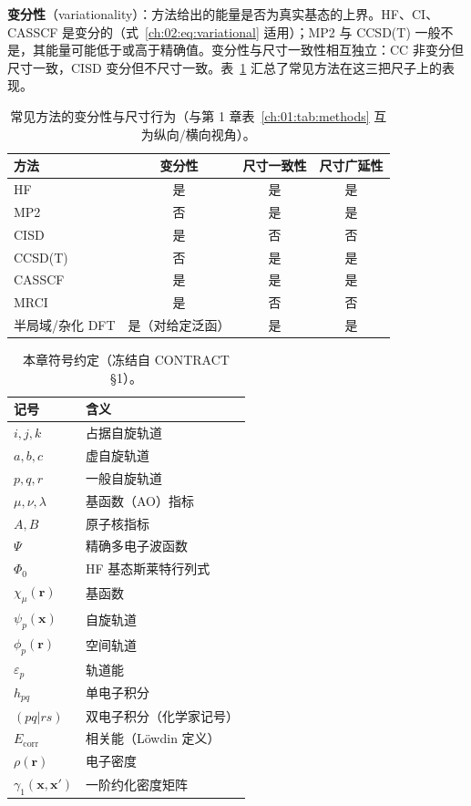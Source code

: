 \textbf{变分性}（variationality）：方法给出的能量是否为真实基态的上界。HF、CI、CASSCF 是变分的（式~\eqref{ch:02:eq:variational} 适用）；MP2 与 CCSD(T) 一般不是，其能量可能低于或高于精确值。变分性与尺寸一致性相互独立：CC 非变分但尺寸一致，CISD 变分但不尺寸一致。表~\ref{ch:02:tab:properties} 汇总了常见方法在这三把尺子上的表现。

\begin{table}[t]
\centering
\small
\caption{常见方法的变分性与尺寸行为（与第 1 章表~\ref{ch:01:tab:methods} 互为纵向/横向视角）。}\label{ch:02:tab:properties}
\begin{tabular}{@{}lccc@{}}
\toprule
方法 & 变分性 & 尺寸一致性 & 尺寸广延性 \\
\midrule
HF & 是 & 是 & 是 \\
MP2 & 否 & 是 & 是 \\
CISD & 是 & 否 & 否 \\
CCSD(T) & 否 & 是 & 是 \\
CASSCF & 是 & 是 & 是 \\
MRCI & 是 & 否 & 否 \\
半局域/杂化 DFT & 是（对给定泛函） & 是 & 是 \\
\bottomrule
\end{tabular}
\end{table}

\begin{table}[t]
\centering
\small
\caption{本章符号约定（冻结自 CONTRACT §1）。}\label{ch:02:tab:symbols}
\begin{tabular}{@{}ll@{}}
\toprule
记号 & 含义 \\
\midrule
$i,j,k$ & 占据自旋轨道 \\
$a,b,c$ & 虚自旋轨道 \\
$p,q,r$ & 一般自旋轨道 \\
$\mu,\nu,\lambda$ & 基函数（AO）指标 \\
$A,B$ & 原子核指标 \\
$\Psi$ & 精确多电子波函数 \\
$\Phi_0$ & HF 基态斯莱特行列式 \\
$\chi_\mu(\mathbf{r})$ & 基函数 \\
$\psi_p(\mathbf{x})$ & 自旋轨道 \\
$\phi_p(\mathbf{r})$ & 空间轨道 \\
$\varepsilon_p$ & 轨道能 \\
$h_{pq}$ & 单电子积分 \\
$(pq\vert rs)$ & 双电子积分（化学家记号） \\
$E_{\mathrm{corr}}$ & 相关能（Löwdin 定义） \\
$\rho(\mathbf{r})$ & 电子密度 \\
$\gamma_1(\mathbf{x},\mathbf{x}')$ & 一阶约化密度矩阵 \\
\bottomrule
\end{tabular}
\end{table}

